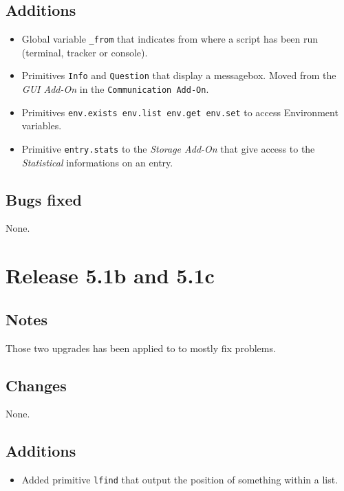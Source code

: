 \subsection{Additions}

\begin{itemize}
\item Global variable {\tt \verb+_from+} that indicates from where a script has been run (terminal, tracker or \squirrel console).
\item Primitives {\tt Info} and {\tt Question} that display a messagebox. Moved
from the {\em GUI Add-On} in the {\tt Communication Add-On}.
\item Primitives {\tt env.exists env.list env.get env.set} to access Environment
variables.
\item Primitive {\tt entry.stats} to the {\em Storage Add-On} that give access to the {\em Statistical} informations on an entry.
\end{itemize}

\subsection{Bugs fixed}

None.

\section{Release 5.1b and 5.1c}

\subsection{Notes}

Those two upgrades has been applied to  to mostly fix problems.

\subsection{Changes}

None.

\subsection{Additions}

\begin{itemize}
\item Added primitive {\tt lfind} that output the position of something within
a list.
\end{itemize}

